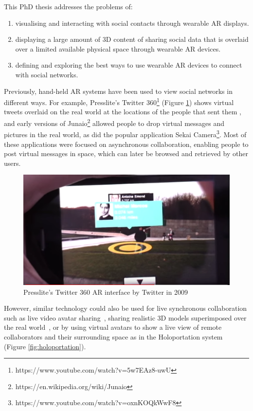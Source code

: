 This PhD thesis addresses the problems of: 
\begin{enumerate}
    \item visualising and interacting with social contacts through wearable AR displays.
    \item displaying a large amount of 3D content of sharing social data that is overlaid over a limited available physical space through wearable AR devices.
    \item defining and exploring the best ways to use wearable AR devices to connect with social networks.
\end{enumerate}

Previously, hand-held AR systems have been used to view social networks in different ways. For example, Presslite's Twitter 360\footnote{https://www.youtube.com/watch?v=5w7EAz8-uwU} (Figure \ref{fig:presslite}) shows virtual tweets overlaid on the real world at the locations of the people that sent them , and early versions of Junaio\footnote{https://en.wikipedia.org/wiki/Junaio} allowed people to drop virtual messages and pictures in the real world, as did the popular application Sekai Camera\footnote{https://www.youtube.com/watch?v=oxnKOQkWwF8}. Most of these applications were focused on asynchronous collaboration, enabling people to post virtual messages in space, which can later be browsed and retrieved by other users. 

\begin{figure}[ht]
    \centering
    \includegraphics[width=0.8\linewidth]{images/10-intro/Presslite-twitter-360.PNG}
    \caption{Presslite's Twitter 360 AR interface by Twitter in 2009}
    \label{fig:presslite}
\end{figure}

However, similar technology could also be used for live synchronous collaboration such as live video avatar sharing~\cite{Billinghurst2002}, sharing realistic 3D models superimposed over the real world~\cite{Fanello2016}, or by using virtual avatars to show a live view of remote collaborators and their surrounding space as in the Holoportation system~\cite{Fanello2016} (Figure \ref{fig:holoportation}).

